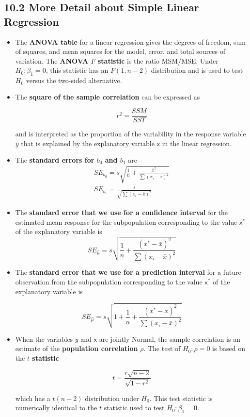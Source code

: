 	\subsection{10.2 More Detail about Simple Linear Regression}
		\begin{itemize}
			\item The \textbf{ANOVA table} for a linear regression gives the degrees of freedom, sum of squares, and mean squares for the model, error, and total sources of variation. The \textbf{ANOVA $F$ statistic} is the ratio MSM/MSE. Under $H_0: \beta_1 = 0$, this statistic has an $F(1, n - 2)$ distribution and is used to test $H_0$ versus the two-sided alternative.
			
			\item The \textbf{square of the sample correlation} can be expressed as
			
			\[r^2=\frac{SSM}{SST}\]
			
			and is interpreted as the proportion of the variability in the response variable $y$ that is explained by the explanatory variable $\mathsf{x}$ in the linear regression.
			
			\item The \textbf{standard errors for $b_0$ and $b_1$} are
			\[\begin{matrix} SE_{b_0}=s\sqrt{\frac{1}{n}+\frac{\bar{x}^2}{\sum (x_i-\bar{x})^2}}\\
			SE_{b_1}=\frac{s}{\sqrt{\sum (x_i-\bar{x})^2}}\end{matrix}\]
					
			\item The \textbf{standard error that we use for a confidence interval} for the estimated mean response for the subpopulation corresponding to the value $\mathsf{x}^{*}$ of the explanatory variable is
			\[SE_{\widehat{\mu}}=s\sqrt{\frac{1}{n}+\frac{(x^{*}-\bar{x})^2}{\sum (x_i-\bar{x})^2}}\]
			
			\item The \textbf{standard error that we use for a prediction interval} for a future observation from the subpopulation corresponding to the value $\mathsf{x}^{*}$ of the explanatory variable is
			
			\[SE_{\widehat{\mu}}=s\sqrt{1+\frac{1}{n}+\frac{(x^{*}-\bar{x})^2}{\sum (x_i-\bar{x})^2}}\]			
			\item When the variables $y$ and $\mathsf{x}$ are jointly Normal, the sample correlation is an estimate of the \textbf{population correlation} $\rho$. The test of $H_0: \rho = 0$ is based on the \textbf{$t$ statistic}
			
			\[t=\frac{r\sqrt{n-2}}{\sqrt{1-r^2}}\]
			
			which has a $t(n - 2)$ distribution under $H_0$. This test statistic is numerically identical to the $t$ statistic used to test $H_0: \beta_1 = 0$.
		\end{itemize}
	